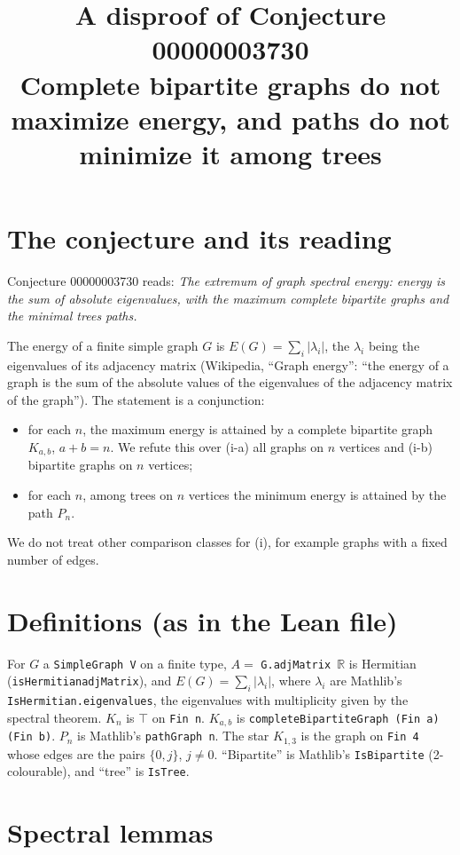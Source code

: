 \documentclass[11pt]{article}
\title{A disproof of Conjecture 00000003730\\[2pt]
\large Complete bipartite graphs do not maximize energy, and paths do not minimize it among trees}
\date{}
\renewcommand{\_}{\oldus\allowbreak}
\theoremstyle{definition}
\theoremstyle{remark}
\begin{document}
\sloppy
\maketitle

\section{The conjecture and its reading}

Conjecture 00000003730 reads: \emph{The extremum of graph spectral energy: energy is the sum of absolute
eigenvalues, with the maximum complete bipartite graphs and the minimal trees paths.}

The energy of a finite simple graph $G$ is $E(G)=\sum_i|\lambda_i|$, the $\lambda_i$ being the eigenvalues of
its adjacency matrix (Wikipedia, ``Graph energy'': ``the energy of a graph is the sum of the absolute values of
the eigenvalues of the adjacency matrix of the graph''). The statement is a conjunction:
\begin{itemize}
\item[(i)] for each $n$, the maximum energy is attained by a complete bipartite graph $K_{a,b}$, $a+b=n$. We
refute this over (i-a) all graphs on $n$ vertices and (i-b) bipartite graphs on $n$ vertices;
\item[(ii)] for each $n$, among trees on $n$ vertices the minimum energy is attained by the path $P_n$.
\end{itemize}
We do not treat other comparison classes for (i), for example graphs with a fixed number of edges.

\section{Definitions (as in the Lean file)}

For $G$ a \texttt{SimpleGraph V} on a finite type, $A=$ \texttt{G.adjMatrix $\mathbb{R}$} is Hermitian
(\texttt{isHermitian\_adjMatrix}), and $E(G)=\sum_i|\lambda_i|$, where $\lambda_i$ are Mathlib's
\texttt{IsHermitian.eigenvalues}, the eigenvalues with multiplicity given by the spectral theorem. $K_n$ is
$\top$ on \texttt{Fin n}. $K_{a,b}$ is \texttt{completeBipartiteGraph (Fin a) (Fin b)}. $P_n$ is Mathlib's
\texttt{pathGraph n}. The star $K_{1,3}$ is the graph on \texttt{Fin 4} whose edges are the pairs
$\{0,j\}$, $j\neq 0$. ``Bipartite'' is Mathlib's \texttt{IsBipartite} (2-colourable), and ``tree'' is
\texttt{IsTree}.

\section{Spectral lemmas}
\end{document}
